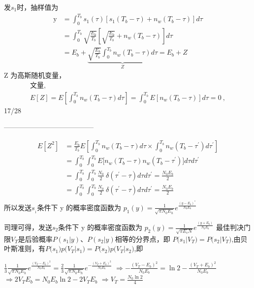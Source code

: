 \documentclass[utf8]{article}
\begin{document}
发$s_1$时，抽样值为
$$\begin{aligned}\text{y}&=\int_{0}^{T_{b}}s_{1}\left(\tau\right)\left[s_{1}\left(T_{b}-\tau\right)+n_{w}\left(T_{b}-\tau\right)\right]d\tau\\&=\int_{0}^{T_{b}}\sqrt{\frac{E_{b}}{T_{b}}}\left[\sqrt{\frac{E_{b}}{T_{b}}}+n_{w}\left(T_{b}-\tau\right)\right]d\tau\\&=E_{b}+\underbrace{\sqrt{\frac{E_{b}}{T_{b}}}\int_{0}^{T_{b}}n_{w}\left(T_{b}-\tau\right)d\tau}_{Z}=E_{b}+Z\end{aligned}$$
Z 为高斯随机变量，
$$\begin{array}{c}{\text{文量,}}\\{E\left[Z\right]=E\left[\int_{0}^{T_{b}}n_{w}\left(T_{b}-\tau\right)d\tau\right]=\int_{0}^{T_{b}}E\left[n_{w}\left(T_{b}-\tau\right)\right]d\tau=0\:,}\end{array}$$
17/28

---------------------------------------

$$\begin{aligned}E\left[Z^{2}\right]&=\frac{E_{b}}{T_{b}}E\left[\int_{0}^{T_{b}}n_{w}\left(T_{b}-\tau\right)d\tau\times\int_{0}^{T_{b}}n_{w}\left(T_{b}-\tau^{\prime}\right)d\tau^{\prime}\right]\\&=\int_{0}^{T_{b}}\int_{0}^{T_{b}}E\Big[n_{w}\left(T_{b}-\tau\right)n_{w}\left(T_{b}-\tau^{\prime}\right)\Big]d\tau d\tau^{\prime}\\&=\int_{0}^{T_{b}}\int_{0}^{T_{b}}\frac{N_{0}}{2}\:\delta\left(\tau^{\prime}-\tau\right)d\tau d\tau^{\prime}=\frac{N_{0}E_{b}}{2}\\&=\int_{0}^{T_{b}}\int_{0}^{T_{b}}\frac{N_{0}}{2}\:\delta\left(\tau^{\prime}-\tau\right)d\tau d\tau^{\prime}=\frac{N_{0}E_{b}}{2}\\\end{aligned}$$
所以发送$s_{_1}$条件下 y 的概率密度函数为 $p_1\left(y\right)=\frac1{\sqrt{\pi N_{0}E_{h}}}e^{\frac{\left(y-E_{b}\right)^{*}}{N_{0}E_{b}}}$

司理可得，发送$s_2$条件下 y 的概率密度函数为 $p_2\left(y\right)=\frac1{\sqrt{\pi E_{c}N}}e^{\frac{\left(y+E_{b}\right)}{N_{0}E_{b}}}$
最佳判决门限$V_T$是后验概率$P(s_1|y)$、$P(s_2|y)$相等的分界点，即
$P\Big(s_{1}|V_{T}\Big)=P\Big(s_{2}|V_{T}\Big)$,由贝叶斯准则，有$P\Big(s_1\Big)p\Big(V_{T}|s_{1}\Big)=P\Big(s_{2}\Big)p\Big(V_{T}|s_{2}\Big)$,即

$\frac{1}{3}\frac{1}{\sqrt{\pi N_{0}E_{h}}}e^{\frac{\left(V_{T}-E_{b}\right)^{2}}{N_{0}E_{b}}}=\frac{2}{3}\frac{1}{\sqrt{\pi N_{0}E_{h}}}e^{-\frac{\left(V_{T}+E_{b}\right)^{2}}{N_{0}E_{b}}}$
$\Rightarrow-\frac{\left(V_{T}-E_{b}\right)^{2}}{N_{0}E_{b}}=\ln2-\frac{\left(V_{T}+E_{b}\right)^{2}}{N_{0}E_{b}}$
$\Rightarrow2V_{T}E_{b}=N_{0}E_{b}\ln2-2V_{T}E_{b}$
$\Rightarrow V_T=\frac{N_0\ln2}4$
\end{document}
